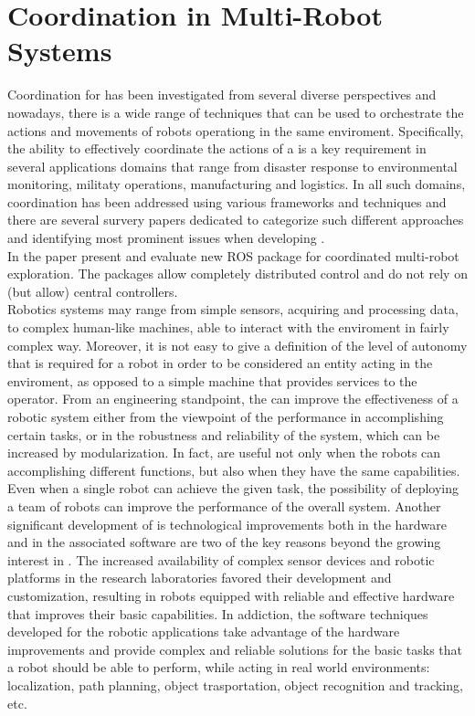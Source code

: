 \section{Coordination in Multi-Robot Systems}
Coordination for \mrs has been investigated from several diverse
perspectives and nowadays, there is a wide range of techniques that can be used to 
orchestrate the actions and movements of robots operationg in the same enviroment.
Specifically, the ability to effectively coordinate the actions of a \mrs is a key 
requirement in several applications domains that range from disaster response to 
environmental monitoring, militaty operations, manufacturing and logistics. 
In all such domains, coordination has been addressed using various frameworks and 
techniques and there are several survery papers dedicated to categorize such different
approaches and identifying most prominent issues when developing \mrs.
\\
In the paper \cite{cooros} present and evaluate new ROS package for coordinated 
multi-robot exploration. The packages allow completely distributed control and do 
not rely on (but allow) central controllers.
\\
Robotics systems may range from simple sensors, acquiring and processing data, to 
complex human-like machines, able to interact with the enviroment in fairly complex way. 
Moreover, it is not easy to give a definition of the level of autonomy that is required 
for a robot in order to be considered an entity acting in the enviroment, as opposed 
to a simple machine that provides services to the operator.
From an engineering standpoint,
the \mrs can improve the effectiveness of a robotic system either from the viewpoint 
of the performance in accomplishing
certain tasks, or in the robustness and reliability of the system,
which can be increased by modularization.
In fact, \mrs are useful not only when the robots can accomplishing different functions, but 
also when they have the same capabilities. Even when a single robot can achieve the given task,
the possibility of deploying a team of robots can improve the performance of the overall system.
Another significant development of \mrs is technological improvements both in the 
hardware and in the associated software are two of the key reasons beyond the growing
interest in \mrs. The increased availability of complex sensor devices and robotic platforms
in the research laboratories favored their development and customization, resulting
in robots equipped with reliable and effective hardware that improves their basic 
capabilities. In addiction, the software techniques developed for the robotic applications
take advantage of the hardware improvements and provide complex and reliable solutions for the basic 
tasks that a robot should be able to perform, while acting in real world environments:
localization, path planning, object trasportation, object recognition and tracking, etc. 

